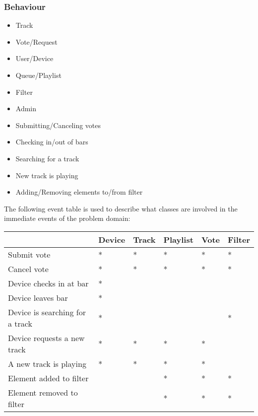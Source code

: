 \subsubsection{Behaviour}

\begin{itemize}
\item Track
\item Vote/Request
\item User/Device
\item Queue/Playlist
\item Filter
\item Admin
\end{itemize}

\begin{itemize}
\item Submitting/Canceling votes
\item Checking in/out of bars
\item Searching for a track
\item New track is playing
\item Adding/Removing elements to/from filter
\end{itemize}

The following event table is used to describe what classes are involved in the immediate events of the problem domain:

\begin{center}
    \begin{tabular}{|l|l|l|l|l|l|}
    \hline
     & Device & Track & Playlist & Vote & Filter \\ \hline
    Submit vote & * & * & * & * & * \\ \hline
    Cancel vote & * & * & * & * & * \\ \hline
    Device checks in at bar & * &   &   &   &   \\ \hline
    Device leaves bar & * &   &   &   &   \\ \hline
    Device is searching for a track & * &   &   &  & * \\ \hline
    Device requests a new track & * & * & * & * &   \\ \hline
    A new track is playing & * & * & * & * &   \\ \hline
    Element added to filter &   &   & * & * & * \\ \hline
    Element removed to filter &   &   & * & * & * \\ \hline
    \end{tabular}
\end{center}